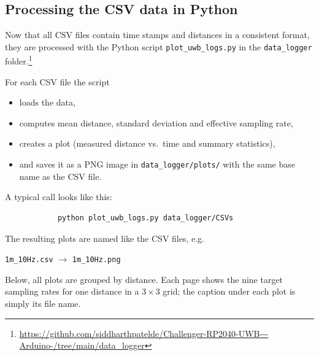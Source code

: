 \documentclass[a4paper,11pt]{article}
\begin{document}
	\subsection{Processing the CSV data in Python}
	\label{subsec:python-processing}
	
	Now that all CSV files contain time stamps and distances in a consistent format,
	they are processed with the Python script \texttt{plot\_uwb\_logs.py} in the
	\texttt{data\_logger} folder.\footnote{\url{https://github.com/siddharthpatelde/Challenger-RP2040-UWB---Arduino-/tree/main/data_logger}}
	
	For each CSV file the script
	
	\begin{itemize}
		\item loads the data,
		\item computes mean distance, standard deviation and effective sampling rate,
		\item creates a plot (measured distance vs.\ time and summary statistics),
		\item and saves it as a PNG image in \texttt{data\_logger/plots/} with the
		same base name as the CSV file.
	\end{itemize}
	
	A typical call looks like this:
	
	\begin{tcolorbox}[colback=black!2, sharp corners, boxrule=0.3pt]
		\begin{verbatim}
			python plot_uwb_logs.py data_logger/CSVs
		\end{verbatim}
	\end{tcolorbox}
	
	The resulting plots are named like the CSV files, e.g.\
	
	\begin{center}
		\texttt{1m\_10Hz.csv} $\rightarrow$ \texttt{1m\_10Hz.png}
	\end{center}
	
	Below, all plots are grouped by distance. Each page shows the nine target
	sampling rates for one distance in a \(3 \times 3\) grid; the caption under
	each plot is simply its file name.
	
\end{document}
